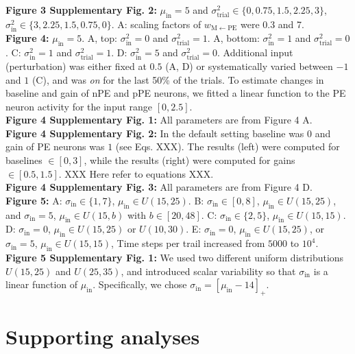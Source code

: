 \documentclass[10pt,a4paper,draft]{article}
\begin{document}
%
\textbf{Figure 3 Supplementary Fig. 2:} $\mu_\mathrm{in} = 5$ and $\sigma^2_\mathrm{trial} \in \lbrace0, 0.75, 1.5, 2.25, 3\rbrace$, $\sigma^2_\mathrm{in} \in \lbrace 3, 2.25, 1.5,0.75, 0\rbrace$. A: scaling factors of $w_\mathrm{M\leftarrow PE}$ were 0.3 and 7.\\
%
\textbf{Figure 4:} $\mu_\mathrm{in} = 5$. A, top: $\sigma^2_\mathrm{in} = 0$ and $\sigma^2_\mathrm{trial} = 1$. A, bottom: $\sigma^2_\mathrm{in} = 1$ and $\sigma^2_\mathrm{trial} = 0$. C: $\sigma^2_\mathrm{in} = 1$ and $\sigma^2_\mathrm{trial} = 1$. D: $\sigma^2_\mathrm{in} = 5$ and $\sigma^2_\mathrm{trial} = 0$. Additional input (perturbation) was either fixed at $0.5$ (A, D) or systematically varied between $-1$ and $1$ (C), and was \textit{on} for the last 50\% of the trials. To estimate changes in baseline and gain of nPE and pPE neurons, we fitted a linear function to the PE neuron activity for the input range $[0, 2.5]$.\\
%
\textbf{Figure 4 Supplementary Fig. 1:} All parameters are from Figure 4 A.\\
%
\textbf{Figure 4 Supplementary Fig. 2:} In the default setting baseline was $0$ and gain of PE neurons was $1$ (see Eqs. XXX). The results (left) were computed for baselines $\in [0, 3]$, while the results (right) were computed for gains $\in [0.5, 1.5]$. XXX Here refer to equations XXX. \\
%
\textbf{Figure 4 Supplementary Fig. 3:} All parameters are from Figure 4 D.\\
%
\textbf{Figure 5:} A: $\sigma_\mathrm{in} \in \lbrace1,7\rbrace$, $\mu_\mathrm{in} \in U(15, 25)$. B: $\sigma_\mathrm{in} \in [0,8]$, $\mu_\mathrm{in} \in U(15, 25)$, and $\sigma_\mathrm{in} = 5$, $\mu_\mathrm{in} \in U(15, b)$ with $b\in [20, 48]$. C: $\sigma_\mathrm{in} \in \lbrace2,5\rbrace$, $\mu_\mathrm{in} \in U(15, 15)$. D: $\sigma_\mathrm{in} = 0$, $\mu_\mathrm{in} \in U(15, 25)$ or $U(10, 30)$. E: $\sigma_\mathrm{in} = 0$, $\mu_\mathrm{in} \in U(15, 25)$, or $\sigma_\mathrm{in} = 5$, $\mu_\mathrm{in} \in U(15, 15)$,  Time steps per trail increased from $5000$ to $10^4$.\\
%
\textbf{Figure 5 Supplementary Fig. 1:} We used two different uniform distributions $U(15, 25)$ and  $U(25, 35)$, and introduced scalar variability so that $\sigma_\mathrm{in}$ is a linear function of $\mu_\mathrm{in}$. Specifically, we chose $\sigma_\mathrm{in} = \left[\mu_\mathrm{in} -14\right]_+$.


\section{Supporting analyses}
\end{document}
